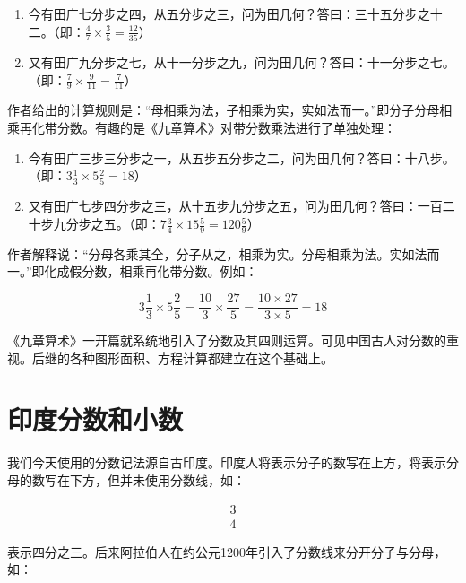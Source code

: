 \documentclass[b5paper]{ctexart}
\begin{document}
\begin{enumerate}[1)]
\item 今有田广七分步之四，从五分步之三，问为田几何？答曰：三十五分步之十二。（即：$\frac{4}{7} \times \frac{3}{5} = \frac{12}{35}$）
\item 又有田广九分步之七，从十一分步之九，问为田几何？答曰：十一分步之七。（即：$\frac{7}{9} \times \frac{9}{11} = \frac{7}{11}$）
\end{enumerate}

作者给出的计算规则是：“母相乘为法，子相乘为实，实如法而一。”即分子分母相乘再化带分数。有趣的是《九章算术》对带分数乘法进行了单独处理：

\begin{enumerate}[1)]
\item 今有田广三步三分步之一，从五步五分步之二，问为田几何？答曰：十八步。（即：$3\frac{1}{3} \times 5\frac{2}{5} = 18$）
\item 又有田广七步四分步之三，从十五步九分步之五，问为田几何？答曰：一百二十步九分步之五。（即：$7\frac{3}{4} \times 15\frac{5}{9} = 120\frac{5}{9}$）
\end{enumerate}

作者解释说：“分母各乘其全，分子从之，相乘为实。分母相乘为法。实如法而一。”即化成假分数，相乘再化带分数。例如：

\[
3\frac{1}{3} \times 5\frac{2}{5} = \frac{10}{3} \times \frac{27}{5} = \frac{10 \times 27}{3 \times 5} = 18
\]

《九章算术》一开篇就系统地引入了分数及其四则运算。可见中国古人对分数的重视。后继的各种图形面积、方程计算都建立在这个基础上。

\section{印度分数和小数}

我们今天使用的分数记法源自古印度。印度人将表示分子的数写在上方，将表示分母的数写在下方，但并未使用分数线，如：

\begin{align*}
  3 \\
  4
\end{align*}

表示四分之三。后来阿拉伯人在约公元1200年引入了分数线来分开分子与分母\cite{Pumfrey-2011}，如：
\end{document}
